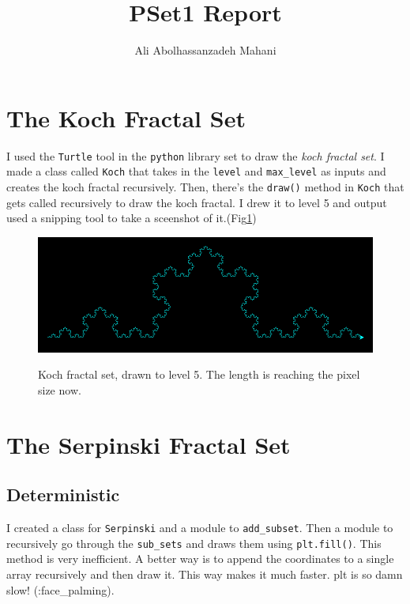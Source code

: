 \documentclass[12pt]{article}
\title{PSet1 Report}
\author{Ali Abolhassanzadeh Mahani}
\begin{document}
	\maketitle
	\section{The Koch Fractal Set}
	I used the \texttt{Turtle} tool in the \texttt{python} library set to draw the \emph{koch fractal set}. I made a class called \texttt{Koch} that takes in the 
	\texttt{level} and \texttt{max\_level} as inputs and creates the koch fractal 
	recursively. Then,
	there's the \texttt{draw()} method in \texttt{Koch} that gets called recursively to draw the koch fractal.
	I drew it to level 5 and output used a snipping tool to take a sceenshot of it.(Fig\ref{fig:koch})
	\begin{figure}[h!]
		\centering
		\includegraphics[width=.9\linewidth]{../P1/koch.png}
		\label{fig:koch}
		\caption{Koch fractal set, drawn to level 5. The length is reaching the pixel size
			now.}
	\end{figure}
	\section{The Serpinski Fractal Set}
		\subsection{Deterministic}
		I created a class for \texttt{Serpinski} and a module to \texttt{add\_subset}. Then a module to recursively go through the \texttt{sub\_sets} and draws them using \texttt{plt.fill()}. This method is very
		inefficient. A better way is to append the coordinates to a single array recursively and then draw it. This
		way makes it much faster. plt is so damn slow! (:face\_palming).
		
\end{document}
